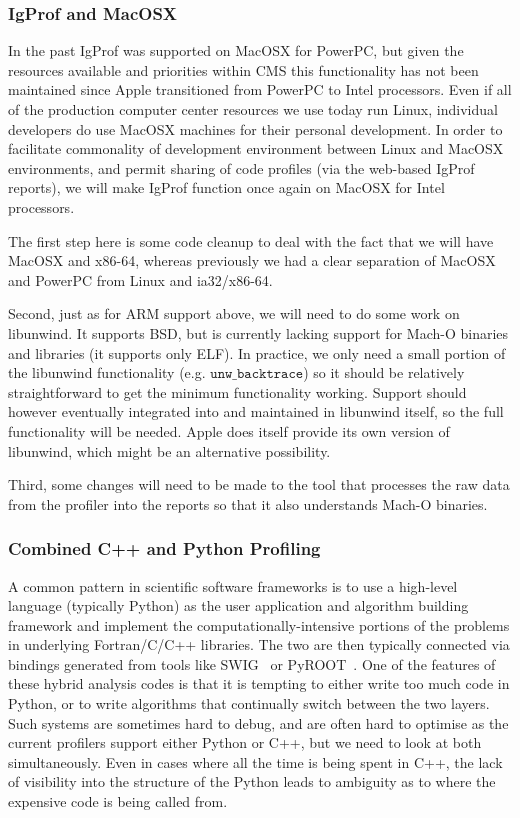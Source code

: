 \documentclass[notitlepage,letter,12pt]{article}
\begin{document}
\subsubsection{IgProf and MacOSX}

In the past IgProf was supported on MacOSX for PowerPC, but given
the resources available and priorities within CMS this functionality has not 
been maintained since Apple transitioned from PowerPC to Intel processors. 
Even if all of the production computer center resources we use today
run Linux, individual developers do use MacOSX machines for their
personal development. In order to facilitate commonality of development
environment between Linux and MacOSX environments, and permit sharing
of code profiles (via the web-based IgProf reports), we will make IgProf
function once again on MacOSX for Intel processors.

The first step here is some code cleanup to deal with the fact that
we will have MacOSX and x86-64, whereas previously we had a clear
separation of MacOSX and PowerPC from Linux and ia32/x86-64.

Second, just as for ARM support above, we will need to do some work
on libunwind. It supports BSD, but is currently lacking support for
Mach-O binaries and libraries (it supports only ELF). In practice,
we only need a small portion of the libunwind functionality (e.g.
$\texttt{unw\_backtrace}$) so it should be relatively straightforward
to get the minimum functionality working. Support should however
eventually integrated into and maintained in libunwind itself, so
the full functionality will be needed. Apple does itself provide its
own version of libunwind, which might be an alternative possibility.

Third, some changes will need to be made to the tool that processes
the raw data from the profiler into the reports so that it also
understands Mach-O binaries.


\subsubsection{Combined C++ and Python Profiling}

A common pattern in scientific software frameworks is to use a
high-level language (typically Python) as the user application and
algorithm building framework and implement the computationally-intensive
portions of the problems in underlying Fortran/C/C++ libraries. The
two are then typically connected via bindings generated from tools
like SWIG~\cite{SWIG} or PyROOT~\cite{PYROOT}. One of the features of these 
hybrid analysis codes is that it is tempting to either write too much code
in Python, or to write
algorithms that continually switch between the two layers.  Such
systems are sometimes hard to debug, and are often hard to optimise
as the current profilers support either Python or C++, but we need
to look at both simultaneously.  Even in cases where all the time
is being spent in C++, the lack of visibility into the structure
of the Python leads to ambiguity as to where the expensive code is
being called from.
\end{document}

